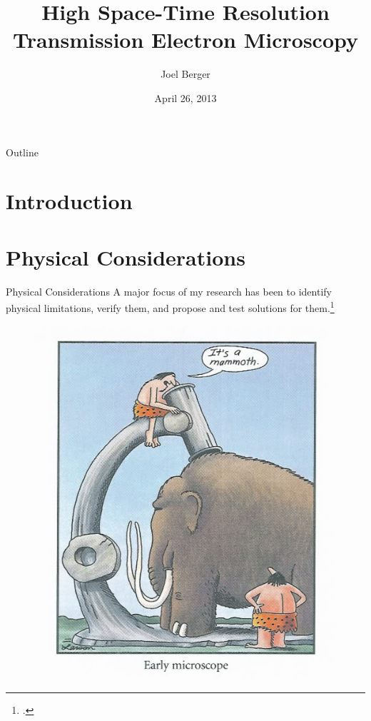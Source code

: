 \documentclass[mathserif]{beamer}
\title[Ultrafast EM]{High Space-Time Resolution\\Transmission Electron Microscopy}
\author{Joel Berger}
\institute[UIC]{Ph.D. Preliminary Examination}
\date{April 26, 2013}
\begin{document}
\begin{frame}
  \maketitle
\end{frame}

\begin{frame}{Outline}
  \tableofcontents
\end{frame}



\section{Introduction}


\section{Physical Considerations}

\begin{frame}{Physical Considerations}
A major focus of my research has been to identify physical limitations, verify them, and propose and test solutions for them.\footcite{berger_dc_2009}
\begin{figure}
  \centering
  \includegraphics{mammoth}
\end{figure}
\end{frame}
\end{document}
